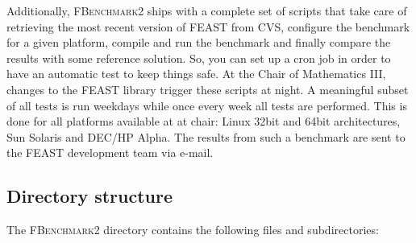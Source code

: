 Additionally, \textsc{FBenchmark2} ships with a complete set of scripts that
take care of retrieving the most recent version of FEAST from CVS, configure
the benchmark for a given platform, compile and run the benchmark and finally
compare the results with some reference solution. So, you can set up a cron job
in order to have an automatic test to keep things safe. At the Chair of
Mathematics III, changes to the FEAST library trigger these scripts at night.
A meaningful subset of all tests is run weekdays while once every week
all tests are performed. This is done for all platforms available at
at chair: Linux 32bit and 64bit architectures, Sun Solaris and DEC/HP Alpha.
The results from such a benchmark are sent to the FEAST
development team via e-mail.


\subsection{Directory structure}
\label{sec:fbenchmark2:directory_structure}

The \textsc{FBenchmark2} directory contains the following files and subdirectories:


